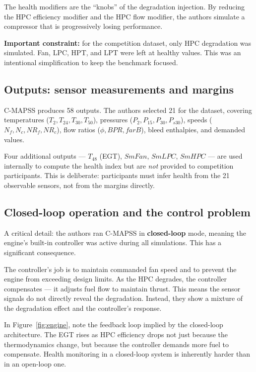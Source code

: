 \documentclass[11pt, a4paper]{article}
\begin{document}
The health modifiers are the ``knobs'' of the degradation injection.
By reducing the HPC efficiency modifier and the HPC flow modifier, the
authors simulate a compressor that is progressively losing performance.

\begin{keybox}
\textbf{Important constraint:} for the competition dataset, only HPC
degradation was simulated. Fan, LPC, HPT, and LPT were left at healthy
values. This was an intentional simplification to keep the benchmark
focused.
\end{keybox}

\subsection{Outputs: sensor measurements and margins}

C-MAPSS produces 58 outputs. The authors selected 21 for the dataset,
covering temperatures ($T_2, T_{24}, T_{30}, T_{50}$), pressures
($P_2, P_{15}, P_{30}, P_{s30}$), speeds ($N_f, N_c, NR_f, NR_c$),
flow ratios ($\phi, BPR, farB$), bleed enthalpies, and demanded values.

Four additional outputs --- $T_{48}$ (EGT), $SmFan$, $SmLPC$,
$SmHPC$ --- are used internally to compute the health index but are
\emph{not} provided to competition participants. This is deliberate:
participants must infer health from the 21 observable sensors, not from
the margins directly.

\subsection{Closed-loop operation and the control problem}

A critical detail: the authors ran C-MAPSS in \textbf{closed-loop}
mode, meaning the engine's built-in controller was active during all
simulations. This has a significant consequence.

The controller's job is to maintain commanded fan speed and to prevent
the engine from exceeding design limits. As the HPC degrades, the
controller compensates --- it adjusts fuel flow to maintain thrust.
This means the sensor signals do not directly reveal the degradation.
Instead, they show a mixture of the degradation effect and the
controller's response.

In Figure~\ref{fig:engine}, note the feedback loop implied by the
closed-loop architecture. The EGT rises as HPC efficiency drops not
just because the thermodynamics change, but because the controller
demands more fuel to compensate. Health monitoring in a closed-loop
system is inherently harder than in an open-loop one.
\end{document}
